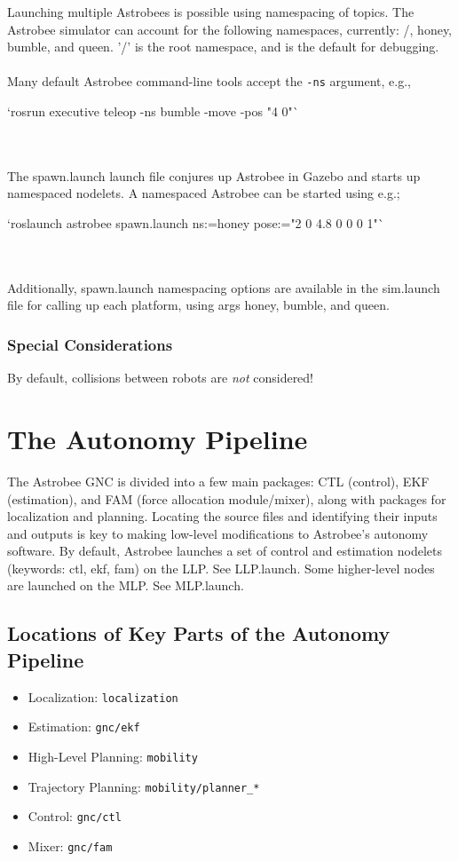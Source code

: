 \documentclass{article}
\begin{document}
Launching multiple Astrobees is possible using namespacing of topics. The Astrobee simulator can account for the following namespaces, currently: /, honey, bumble, and queen. '/' is the root namespace, and is the default for debugging.
\\\\
Many default Astrobee command-line tools accept the \texttt{-ns} argument, e.g.,\\
\begin{markdown}
`rosrun executive teleop -ns bumble -move -pos "4 0"`
\end{markdown}
\\\\
The spawn.launch launch file conjures up Astrobee in Gazebo and starts up namespaced nodelets. A namespaced Astrobee can be started using e.g.;\\
\begin{markdown}
`roslaunch astrobee spawn.launch ns:=honey pose:="2 0 4.8 0 0 0 1"`
\end{markdown}
\\\\
Additionally, spawn.launch namespacing options are available in the sim.launch file for calling up each platform, using args honey, bumble, and queen.

\subsubsection{Special Considerations}

By default, collisions between robots are \textit{not} considered!

\section{The Autonomy Pipeline}

The Astrobee GNC is divided into a few main packages: CTL (control), EKF (estimation), and FAM (force allocation module/mixer), along with packages for localization and planning. Locating the source files and identifying their inputs and outputs is key to making low-level modifications to Astrobee's autonomy software. By default, Astrobee launches a set of control and estimation nodelets (keywords: ctl, ekf, fam) on the LLP. See LLP.launch. Some higher-level nodes are launched on the MLP. See MLP.launch.

\subsection{Locations of Key Parts of the Autonomy Pipeline}
\begin{itemize}
    \item Localization: \texttt{localization}
    \item Estimation:  \texttt{gnc/ekf}
    \item High-Level Planning: \texttt{mobility}
    \item Trajectory Planning: \texttt{mobility/planner\_*}
    \item Control: \texttt{gnc/ctl}
    \item Mixer: \texttt{gnc/fam}
\end{itemize}
\end{document}
